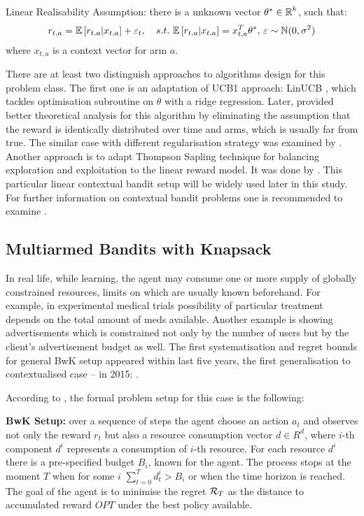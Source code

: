   \begin{definition}
    \label{def:linear_relisability_assumption}
      Linear Realisability Assumption: there is a unknown vector $\theta^* \in \operatorname{\mathbb{R}}^k$, such that: 
        \begin{equation*}
                r_{t,a} = \operatorname{\mathbb{E}}\left[r_{t,a}|x_{t,a}\right] + \varepsilon_t, \quad s.t. \,\operatorname{\mathbb{E}}\left[r_{t,a}|x_{t,a}\right] = x_{t,a}^T\theta^*,\, \varepsilon \sim \operatorname{\mathbb{N}}(0, \sigma^2)
        \end{equation*}  
        where $x_{t,a}$ is a context vector for arm $a$.
  \end{definition}
  There are at least two distinguish approaches to algorithms design for this problem class. The first one is an adaptation of UCB1 approach: LinUCB \cite{Li2010}, which tackles optimisation subroutine on $\theta$ with a ridge regression. Later, \cite{Abbasi-Yadkori2011} provided better theoretical analysis for this algorithm by eliminating the assumption that the reward is identically distributed over time and arms, which is usually far from true. The similar case with different regularisation strategy was examined by \cite{Auer2003}. Another approach is to adapt Thompson Sapling technique \cite{Li2011} for balancing exploration and exploitation to the linear reward model. It was done by \cite{Agrawal2013}. This particular linear contextual bandit setup will be widely used later in this study. For further information on contextual bandit problems one is recommended to examine \cite{Zhou2015}.
  
  \subsection{Multiarmed Bandits with Knapsack}
  In real life, while learning, the agent may consume one or more supply of globally constrained resources, limits on which are usually known beforehand. For example, in experimental medical trials possibility of particular treatment depends on the total amount of meds available. Another example is showing advertisements which is constrained not only by the number of users but by the client's advertisement budget as well. The first systematisation and regret bounds for general BwK setup \cite{Badanidiyuru2013} appeared within last five years, the first generalisation to contextualised case -- in 2015: \cite{Agrawal2015}.
  
  According to \cite{Badanidiyuru2013}, the formal problem setup for this case is the following: 
  
  \begin{definition} \textbf{BwK Setup:} over a sequence of steps the agent choose an action $a_t$ and observes not only the reward $r_t$ but also a resource consumption vector $d \in R^d$, where $i$-th component $d^i$ represents a consumption of $i$-th resource. For each resource $d^i$ there is a pre-specified budget $B_i$, known for the agent. The process stops at the moment $T$ when for some $i$ $\sum_{t=0}^Td^i_t > B_i$ or when the time horizon is reached. The goal of the agent is to minimise the regret $\operatorname{\mathcal{R}}_T$ as the distance to accumulated reward $OPT$ under the best policy available.     
  \end{definition}

